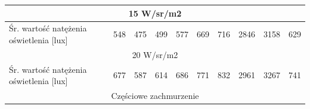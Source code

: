 \documentclass[a4paper,12pt]{article}
\begin{document}
\begin{table}[!ht]
\begin{tabular}{|c|c|c|c|c|c|c|c|c|c|}
\multicolumn{10}{|c|}{15 W/sr/m2}                                                                                                                                                                                                                                                                                                                                                                                                                                                                                                                                  \\ \hline
\multicolumn{1}{|l|}{Śr. wartość natężenia oświetlenia {[}lux{]}} & \cellcolor[HTML]{F6E9C3}548                        & \cellcolor[HTML]{F6E9C3}475                        & \cellcolor[HTML]{F6E9C3}499                        & \cellcolor[HTML]{F6E9C3}577                        & \cellcolor[HTML]{F6E9C3}669                        & \cellcolor[HTML]{F6E9C3}716                        & \cellcolor[HTML]{F6E9C3}2846                       & \cellcolor[HTML]{F6E9C3}3158                       & \cellcolor[HTML]{F6E9C3}629                        \\ \hline
\multicolumn{10}{|c|}{20 W/sr/m2}                                                                                                                                                                                                                                                                                                                                                                                                                                                                                                                                  \\ \hline
\multicolumn{1}{|l|}{Śr. wartość natężenia oświetlenia {[}lux{]}} & \cellcolor[HTML]{F6E9C3}677                        & \cellcolor[HTML]{F6E9C3}587                        & \cellcolor[HTML]{F6E9C3}614                        & \cellcolor[HTML]{F6E9C3}686                        & \cellcolor[HTML]{F6E9C3}771                        & \cellcolor[HTML]{F6E9C3}832                        & \cellcolor[HTML]{F6E9C3}2961                       & \cellcolor[HTML]{F6E9C3}3267                       & \cellcolor[HTML]{F6E9C3}741                        \\ \hline
\multicolumn{10}{|c|}{\cellcolor[HTML]{B2BFE5}Częściowe zachmurzenie}                                                                                                                                                                                                                                                                                                                                                                                                                                                                                              \\ \hline

\end{tabular}
\end{table}
\end{document}
